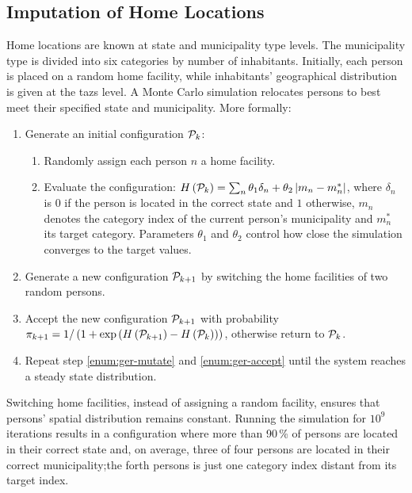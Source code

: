 \subsection{Imputation of Home Locations}
\label{ch:germany:imputation1}
Home locations are known at state and municipality type levels. The municipality type is divided into six categories by number of inhabitants. Initially, each person is placed on a random home facility, while inhabitants' geographical distribution is given at the \glspl{taz} level. A Monte Carlo simulation relocates persons to best meet their specified state and municipality. More formally:

\begin{enumerate}
\item Generate an initial configuration ${\cal P}_k$:
\begin{enumerate}
\item Randomly assign each person $n$ a home facility.

\item Evaluate the configuration: $H\left( {\cal P}_k \right)= \sum_n \theta_1 \delta_n+ \theta_2 \left| m_n - m_{n}^* \right|$, where $\delta_n$ is $0$ if the person is located in the correct state and $1$ otherwise, $m_n$ denotes the category index of the current person's municipality and $m_{n}^*$ its target category. Parameters $\theta_1$ and $\theta_2$ control how close the simulation converges to the target values.

\end{enumerate}

\item \label{enum:ger-mutate} Generate a new configuration ${\cal P}_{k+1}$ by switching the home facilities of two random persons.

\item \label{enum:ger-accept} Accept the new configuration ${\cal P}_{k+1}$ with probability $\pi_{k+1} = 1 / \left( 1 + \exp \left(  H\left( {\cal P}_{k+1} \right) - H \left( {\cal P}_{k} \right) \right)\right)$, otherwise return to ${\cal P}_{k}$.

\item Repeat step \ref{enum:ger-mutate} and \ref{enum:ger-accept} until the system reaches a steady state distribution.
\end{enumerate}

Switching home facilities, instead of assigning a random facility, ensures that persons' spatial distribution remains constant. Running the simulation for $10^9$ iterations results in a configuration where more than 90\,\% of persons are located in their correct state and, on average, three of four persons are located in their correct municipality;the forth persons is just one category index distant from its target index.

